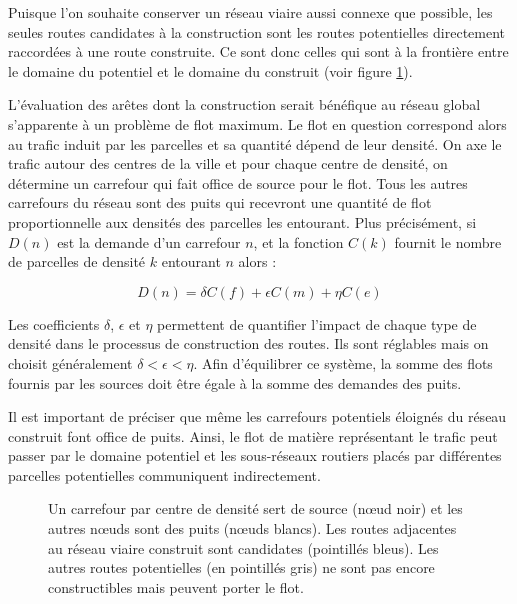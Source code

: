 \documentclass[10pt]{article}
\begin{document}
Puisque l'on souhaite conserver un réseau viaire aussi connexe que
possible, les seules routes candidates à la construction sont les
routes potentielles directement raccordées à une route construite. Ce
sont donc celles qui sont à la frontière entre le domaine du potentiel
et le domaine du construit (voir figure \ref{fig:network}).

L'évaluation des arêtes dont la construction serait bénéfique au
réseau global s'apparente à un problème de flot maximum. Le flot en
question correspond alors au trafic induit par les parcelles et sa
quantité dépend de leur densité. On axe le trafic autour des centres
de la ville et pour chaque centre de densité, on détermine un
carrefour qui fait office de source pour le flot. Tous les autres
carrefours du réseau sont des puits qui recevront une quantité de flot
proportionnelle aux densités des parcelles les entourant. Plus
précisément, si $D(n)$ est la demande d'un carrefour $n$, et la
fonction $C(k)$ fournit le nombre de parcelles de densité $k$
entourant $n$ alors :

\begin{equation}
  D(n) = \delta C(f) + \epsilon C(m) + \eta C(e)
\end{equation}

Les coefficients $\delta$, $\epsilon$ et $\eta$ permettent de
quantifier l'impact de chaque type de densité dans le processus de
construction des routes. Ils sont réglables mais on choisit
généralement $\delta < \epsilon < \eta$. Afin d'équilibrer ce système,
la somme des flots fournis par les sources doit être égale à la somme
des demandes des puits.

Il est important de préciser que même les carrefours potentiels
éloignés du réseau construit font office de puits. Ainsi, le flot de
matière représentant le trafic peut passer par le domaine potentiel et
les sous-réseaux routiers placés par différentes parcelles
potentielles communiquent indirectement.

\begin{figure}[H]
  \centering
  
  \caption{Un carrefour par centre de densité sert de source (n\oe ud
    noir) et les autres n\oe uds sont des puits (n\oe uds blancs). Les
    routes adjacentes au réseau viaire construit sont candidates
    (pointillés bleus). Les autres routes potentielles (en pointillés
    gris) ne sont pas encore constructibles mais peuvent porter le
    flot.}
  \label{fig:network}
\end{figure}
\end{document}
